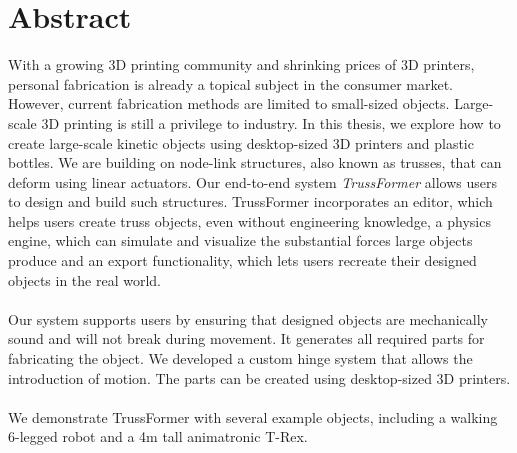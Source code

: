 \begingroup
\let\cleardoublepage\relax
\let\cleardoublepage\relax

\chapter*{Abstract}
With a growing 3D printing community and shrinking prices of 3D printers, personal fabrication is already a topical subject in the consumer market. However, current fabrication methods are limited to small-sized objects. Large-scale 3D printing is still a privilege to industry. In this thesis, we explore how to create large-scale kinetic objects using desktop-sized 3D printers and plastic bottles. We are building on node-link structures, also known as trusses, that can deform using linear actuators. Our end-to-end system \textit{TrussFormer} allows users to design and build such structures. TrussFormer incorporates an editor, which helps users create truss objects, even without engineering knowledge, a physics engine, which can simulate and visualize the substantial forces large objects produce and an export functionality, which lets users recreate their designed objects in the real world.\\
\\
Our system supports users by ensuring that designed objects are mechanically sound and will not break during movement. It generates all required parts for fabricating the object. We developed a custom hinge system that allows the introduction of motion. The parts can be created using desktop-sized 3D printers.\\
\\
We demonstrate TrussFormer with several example objects, including a walking 6-legged robot and a 4m tall animatronic T-Rex.

\clearpage

